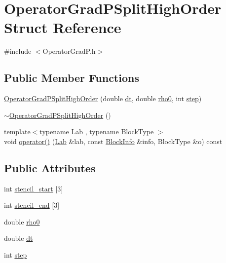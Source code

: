 \hypertarget{struct_operator_grad_p_split_high_order}{}\section{Operator\+Grad\+P\+Split\+High\+Order Struct Reference}
\label{struct_operator_grad_p_split_high_order}


{\ttfamily \#include $<$Operator\+Grad\+P.\+h$>$}

\subsection*{Public Member Functions}
\begin{DoxyCompactItemize}
\item 
\hyperlink{struct_operator_grad_p_split_high_order_a618b48adbb0857d72df05bb4a960ef35}{Operator\+Grad\+P\+Split\+High\+Order} (double \hyperlink{struct_operator_grad_p_split_high_order_a0e454d2d86b5c09cfaab1b16f1db56ac}{dt}, double \hyperlink{struct_operator_grad_p_split_high_order_a8e9a57fe142fd9f9023bc642ca40b294}{rho0}, int \hyperlink{struct_operator_grad_p_split_high_order_a6fff9a66cc8526d52c945a95ab49668b}{step})
\item 
\hyperlink{struct_operator_grad_p_split_high_order_a959a49282859f66d8f8b0edf192390ea}{$\sim$\+Operator\+Grad\+P\+Split\+High\+Order} ()
\item 
{\footnotesize template$<$typename Lab , typename Block\+Type $>$ }\\void \hyperlink{struct_operator_grad_p_split_high_order_af1a9134e8ea512934a867636afc033b7}{operator()} (\hyperlink{_definitions_8h_ad6f951af9a2a6ebc1975404882b34314}{Lab} \&lab, const \hyperlink{struct_block_info}{Block\+Info} \&info, Block\+Type \&o) const 
\end{DoxyCompactItemize}
\subsection*{Public Attributes}
\begin{DoxyCompactItemize}
\item 
int \hyperlink{struct_operator_grad_p_split_high_order_a2493fb5fd44419dce1219201fe62120b}{stencil\+\_\+start} \mbox{[}3\mbox{]}
\item 
int \hyperlink{struct_operator_grad_p_split_high_order_a2b1fb9ec48235dc12d35d815661b3a1d}{stencil\+\_\+end} \mbox{[}3\mbox{]}
\item 
double \hyperlink{struct_operator_grad_p_split_high_order_a8e9a57fe142fd9f9023bc642ca40b294}{rho0}
\item 
double \hyperlink{struct_operator_grad_p_split_high_order_a0e454d2d86b5c09cfaab1b16f1db56ac}{dt}
\item 
int \hyperlink{struct_operator_grad_p_split_high_order_a6fff9a66cc8526d52c945a95ab49668b}{step}
\end{DoxyCompactItemize}


